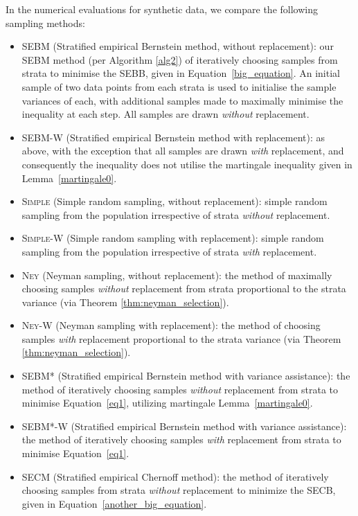 In the numerical evaluations for synthetic data, we compare the following sampling methods:
\begin{itemize}
\item 
\textsc{SEBM} (Stratified empirical Bernstein method, without replacement):
our SEBM method (per Algorithm \ref{alg2}) of iteratively choosing samples from strata to minimise the SEBB, given in Equation~\eqref{big_equation}. 
An initial sample of two data points from each strata is used to initialise the sample variances of each, with additional samples made to maximally minimise the inequality at each step. All samples are drawn \textit{without} replacement.
\item 
\textsc{SEBM-W} (Stratified empirical Bernstein method with replacement): 
as above, with the exception that all samples are drawn \textit{with} replacement, and consequently the inequality does not utilise the martingale inequality given in Lemma~\ref{martingale0}.
\item 
\textsc{Simple} (Simple random sampling, without replacement): simple random sampling from the population irrespective of strata \textit{without} replacement.
\item 
\textsc{Simple-W} (Simple random sampling with replacement): 
simple random sampling from the population irrespective of strata \textit{with} replacement.
\item \textsc{Ney} (Neyman sampling, without replacement): the method of maximally choosing samples \textit{without} replacement from strata proportional to the strata variance (via Theorem \ref{thm:neyman_selection}).
\item \textsc{Ney-W} (Neyman sampling with replacement): the method of choosing samples \textit{with} replacement proportional to the strata variance (via Theorem \ref{thm:neyman_selection}).
\item \textsc{SEBM*} (Stratified empirical Bernstein method with variance assistance): the method of iteratively choosing samples \textit{without} replacement from strata to minimise Equation~\eqref{eq1}, utilizing martingale Lemma~\ref{martingale0}.
\item \textsc{SEBM*-W} (Stratified empirical Bernstein method with variance assistance): the method of iteratively choosing samples \textit{with} replacement from strata to minimise Equation~\eqref{eq1}.
\item \textsc{SECM} (Stratified empirical Chernoff method): the method of iteratively choosing samples from strata \textit{without} replacement to minimize the SECB, given in Equation~\eqref{another_big_equation}. 

\end{itemize}
